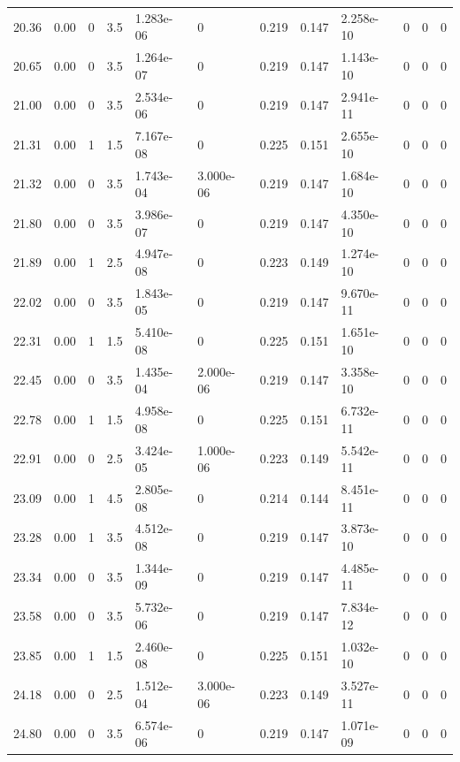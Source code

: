 \documentclass[preview]{standalone}
\begin{document}
{{{\begin{tabular}{L{1.2cm}C{1.2cm} C{0.3cm}C{0.5cm} C{1.4cm}C{1.4cm} C{1.4cm}C{1.4cm} C{1.6cm}C{1.6cm} C{1.6cm}C{1.6cm}}
  20.36  &  0.00  & 0     & 3.5 &  1.283e-06  & 0  &  0.219&   0.147& 2.258e-10 & 0   &  0 & 0  \\ 
  20.65  &  0.00  & 0     & 3.5 &  1.264e-07  & 0  &  0.219&   0.147& 1.143e-10 & 0   &  0 & 0  \\ 
  21.00  &  0.00  & 0     & 3.5 &  2.534e-06  & 0  &  0.219&   0.147& 2.941e-11 & 0   &  0 & 0  \\ 
  21.31  &  0.00  & 1     & 1.5 &  7.167e-08  & 0  &  0.225&   0.151& 2.655e-10 & 0   &  0 & 0  \\ 
  21.32  &  0.00  & 0     & 3.5 &  1.743e-04  & 3.000e-06  &  0.219&   0.147& 1.684e-10 & 0   &  0 & 0  \\ 
  21.80  &  0.00  & 0     & 3.5 &  3.986e-07  & 0  &  0.219&   0.147& 4.350e-10 & 0   &  0 & 0  \\ 
  21.89  &  0.00  & 1     & 2.5 &  4.947e-08  & 0  &  0.223&   0.149& 1.274e-10 & 0   &  0 & 0  \\ 
  22.02  &  0.00  & 0     & 3.5 &  1.843e-05  & 0  &  0.219&   0.147& 9.670e-11 & 0   &  0 & 0  \\ 
  22.31  &  0.00  & 1     & 1.5 &  5.410e-08  & 0  &  0.225&   0.151& 1.651e-10 & 0   &  0 & 0  \\ 
  22.45  &  0.00  & 0     & 3.5 &  1.435e-04  & 2.000e-06  &  0.219&   0.147& 3.358e-10 & 0   &  0 & 0  \\ 
  22.78  &  0.00  & 1     & 1.5 &  4.958e-08  & 0  &  0.225&   0.151& 6.732e-11 & 0   &  0 & 0  \\ 
  22.91  &  0.00  & 0     & 2.5 &  3.424e-05  & 1.000e-06  &  0.223&   0.149& 5.542e-11 & 0   &  0 & 0  \\ 
  23.09  &  0.00  & 1     & 4.5 &  2.805e-08  & 0  &  0.214&   0.144& 8.451e-11 & 0   &  0 & 0  \\ 
  23.28  &  0.00  & 1     & 3.5 &  4.512e-08  & 0  &  0.219&   0.147& 3.873e-10 & 0   &  0 & 0  \\ 
  23.34  &  0.00  & 0     & 3.5 &  1.344e-09  & 0  &  0.219&   0.147& 4.485e-11 & 0   &  0 & 0  \\ 
  23.58  &  0.00  & 0     & 3.5 &  5.732e-06  & 0  &  0.219&   0.147& 7.834e-12 & 0   &  0 & 0  \\ 
  23.85  &  0.00  & 1     & 1.5 &  2.460e-08  & 0  &  0.225&   0.151& 1.032e-10 & 0   &  0 & 0  \\ 
  24.18  &  0.00  & 0     & 2.5 &  1.512e-04  & 3.000e-06  &  0.223&   0.149& 3.527e-11 & 0   &  0 & 0  \\ 
  24.80  &  0.00  & 0     & 3.5 &  6.574e-06  & 0  &  0.219&   0.147& 1.071e-09 & 0   &  0 & 0  \\ 

\end{tabular}}}}
\end{document}
